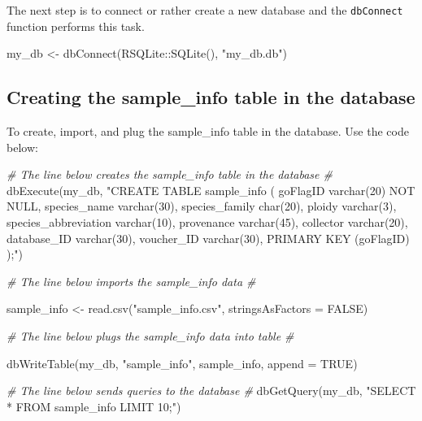 \documentclass[
]{book}
\newenvironment{Shaded}{\begin{snugshade}}{\end{snugshade}}
\newcommand{\AttributeTok}[1]{\textcolor[rgb]{0.77,0.63,0.00}{#1}}
\newcommand{\CommentTok}[1]{\textcolor[rgb]{0.56,0.35,0.01}{\textit{#1}}}
\newcommand{\ConstantTok}[1]{\textcolor[rgb]{0.00,0.00,0.00}{#1}}
\newcommand{\FunctionTok}[1]{\textcolor[rgb]{0.00,0.00,0.00}{#1}}
\newcommand{\NormalTok}[1]{#1}
\newcommand{\OtherTok}[1]{\textcolor[rgb]{0.56,0.35,0.01}{#1}}
\newcommand{\SpecialCharTok}[1]{\textcolor[rgb]{0.00,0.00,0.00}{#1}}
\newcommand{\StringTok}[1]{\textcolor[rgb]{0.31,0.60,0.02}{#1}}
\begin{document}
The next step is to connect or rather create a new database and the \texttt{dbConnect} function performs this task.

\begin{Shaded}
\begin{Highlighting}[]
\NormalTok{my\_db }\OtherTok{\textless{}{-}} \FunctionTok{dbConnect}\NormalTok{(RSQLite}\SpecialCharTok{::}\FunctionTok{SQLite}\NormalTok{(), }\StringTok{"my\_db.db"}\NormalTok{)}
\end{Highlighting}
\end{Shaded}

\hypertarget{creating-the-sample_info-table-in-the-database}{%
\subsection{Creating the sample\_info table in the database}\label{creating-the-sample_info-table-in-the-database}}

To create, import, and plug the sample\_info table in the database. Use the code below:

\begin{Shaded}
\begin{Highlighting}[]
\CommentTok{\# The line below creates the sample\_info table in the database \#}
\FunctionTok{dbExecute}\NormalTok{(my\_db, }\StringTok{"CREATE TABLE sample\_info (}
\StringTok{                        goFlagID varchar(20) NOT NULL,}
\StringTok{                        species\_name varchar(30),}
\StringTok{                        species\_family char(20),}
\StringTok{                        ploidy varchar(3),}
\StringTok{                        species\_abbreviation varchar(10),}
\StringTok{                        provenance varchar(45),}
\StringTok{                        collector varchar(20),}
\StringTok{                        database\_ID varchar(30),}
\StringTok{                        voucher\_ID varchar(30),}
\StringTok{                        PRIMARY KEY (goFlagID)}
\StringTok{                        );"}\NormalTok{)}

\CommentTok{\# The line below imports the sample\_info data \#}

\NormalTok{sample\_info }\OtherTok{\textless{}{-}} \FunctionTok{read.csv}\NormalTok{(}\StringTok{"sample\_info.csv"}\NormalTok{, }\AttributeTok{stringsAsFactors =} \ConstantTok{FALSE}\NormalTok{)}


\CommentTok{\# The line below plugs the sample\_info data into table \#}

\FunctionTok{dbWriteTable}\NormalTok{(my\_db, }\StringTok{"sample\_info"}\NormalTok{, sample\_info, }\AttributeTok{append =} \ConstantTok{TRUE}\NormalTok{)}


\CommentTok{\# The line below sends queries to the database  \#}
\FunctionTok{dbGetQuery}\NormalTok{(my\_db, }\StringTok{"SELECT * FROM sample\_info LIMIT 10;"}\NormalTok{)}
\end{Highlighting}
\end{Shaded}
\end{document}
